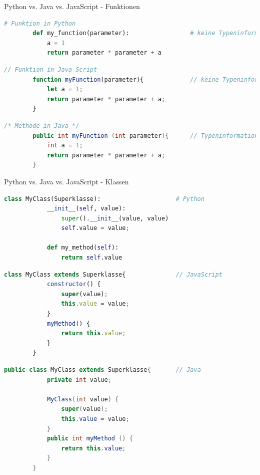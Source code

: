 \begin{frame}[fragile]{Python vs. Java vs. JavaScript - Funktionen}
    \begin{lstlisting}[language=Python, gobble=8]
        # Funktion in Python
        def my_function(parameter):                 # keine Typeninformation
            a = 1
            return parameter * parameter + a
    \end{lstlisting}
    \begin{lstlisting}[language=JavaScript, gobble=8]
        // Funktion in Java Script
        function myFunction(parameter){             // keine Typeninformation
            let a = 1;
            return parameter * parameter + a;
        }
    \end{lstlisting}
    \begin{lstlisting}[language=Java, gobble=8]
        /* Methode in Java */
        public int myFunction (int parameter){      // Typeninformation
            int a = 1;
            return parameter * parameter + a;
        }
        \end{lstlisting}
\end{frame}

\begin{frame}[fragile]{Python vs. Java vs. JavaScript - Klassen}
    \begin{lstlisting}[language=Python, gobble=8]
        class MyClass(Superklasse):                     # Python
            __init__(self, value):
                super().__init__(value, value)
                self.value = value;

            def my_method(self):
                return self.value
    \end{lstlisting}
    \begin{lstlisting}[language=JavaScript, gobble=8]
        class MyClass extends Superklasse{              // JavaScript
            constructor() {
                super(value);
                this.value = value;
            }
            myMethod() {
                return this.value;
            }
        }
    \end{lstlisting}
    \begin{lstlisting}[language=Java, gobble=8]
        public class MyClass extends Superklasse{       // Java
            private int value;

            MyClass(int value) {
                super(value);
                this.value = value;
            }
            public int myMethod () {
                return this.value;
            }
        }
    \end{lstlisting}
\end{frame}


